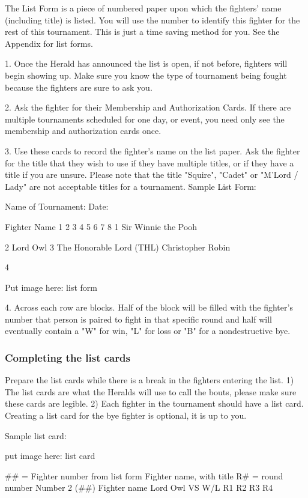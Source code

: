 \documentclass{article}
\begin{document}
The List Form is a piece of numbered paper upon which the fighters’ name (including title) is listed. You
will use the number to identify this fighter for the rest of this tournament. This is just a time saving
method for you. See the Appendix for list forms.

1. Once the Herald has announced the list is open, if not before, fighters will begin showing up. Make
sure you know the type of tournament being fought because the fighters are sure to ask you.

2. Ask the fighter for their Membership and Authorization Cards. If there are multiple tournaments
scheduled for one day, or event, you need only see the membership and authorization cards once.

3. Use these cards to record the fighter’s name on the list paper. Ask the fighter for the title that they
wish to use if they have multiple titles, or if they have a title if you are unsure. Please note that the title
"Squire", "Cadet" or "M’Lord / Lady" are not acceptable titles for a tournament.
Sample List Form:

Name of Tournament: Date:

Fighter Name 1 2 3 4 5 6 7 8
1 Sir Winnie the Pooh

2 Lord Owl
3
The Honorable Lord (THL)
Christopher Robin

4

Put image here: list form


4. Across each row are blocks. Half of the block will be filled with the fighter’s number that person is
paired to fight in that specific round and half will eventually contain a "W" for win, "L" for loss or
"B" for a nondestructive bye.


\subsubsection{Completing the list cards}

Prepare the list cards while there is a break in the fighters entering the list.
1) The list cards are what the Heralds will use to call the bouts, please make sure these cards are legible.
2) Each fighter in the tournament should have a list card. Creating a list card for the bye fighter is
optional, it is up to you.

Sample list card:

put image here: list card

\#\# = Fighter number from list form
Fighter name, with title
R\# = round number
Number 2 (\#\#)
Fighter name
Lord Owl
VS W/L
R1
R2
R3
R4
\end{document}
